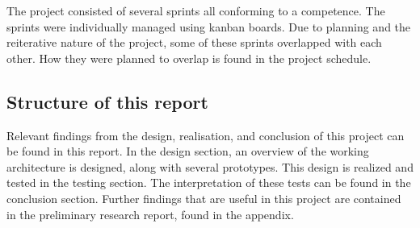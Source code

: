 The project consisted of several sprints all conforming to a competence. The sprints were individually managed using kanban \cite{kanban} boards. Due to planning and the reiterative nature of the project, some of these sprints overlapped with each other. How they were planned to overlap is found in the project schedule.\cite{projectplan}\\



\subsection{Structure of this report}
Relevant findings from the design, realisation, and conclusion of this project can be found in this report. In the design section, an overview of the working architecture is designed, along with several prototypes. This design is realized and tested in the testing section. The interpretation of these tests can be found in the conclusion section. Further findings that are useful in this project are contained in the preliminary research report, found in the appendix. \cite{prr}